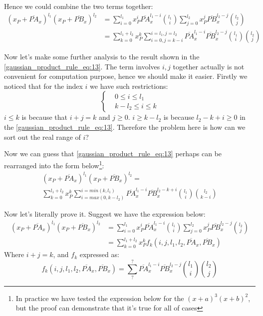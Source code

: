 Hence we could combine the two terms together:
\begin{equation}
\label{gaussian_product_rule_eq:13}
\begin{split}
(x_{P} +\overline{PA}_{x})^{l_{1}}(x_{P} + \overline{PB}_{x})^{l_{2}}
&=  \sum_{i=0}^{l_{1}} x_{P}^{i}\overline{PA}_{x}^{l_{1}-i}
\binom{l_{1}}{i}
    \sum_{j=0}^{l_{2}} x_{P}^{j}\overline{PB}_{x}^{l_{2}-j}
\binom{l_{2}}{j} \\
&= \sum_{k=0}^{l_{1}+l_{2}}x_{P}^{k}
\sum_{i=0,j=k-i}^{i=l_{1},j=l_{2}}\overline{PA}_{x}^{l_{1}-i}
\overline{PB}_{x}^{l_{2}-j}\binom{l_{1}}{i}\binom{l_{2}}{j}
\end{split}
\end{equation}

Now let's make some further analysis to the result shown in the \ref{gaussian_product_rule_eq:13}.
The term involves $i,j$ together actually is not convenient for computation purpose, hence we should
make it easier. Firstly we noticed that for the index $i$ we have such restrictions:
\begin{equation}
 \begin{cases}
  &0 \leq i \leq l_{1} \\
  &k-l_{2} \leq i \leq k
 \end{cases}
\end{equation}
$i\leq k$ is because that $i+j=k$ and $j\geq 0$. $i\geq k-l_{2}$ is because $l_{2} - k+i \geq 0$ in 
the \ref{gaussian_product_rule_eq:13}. Therefore the problem here is how can we sort out the 
real range of $i$?

Now we can guess that \ref{gaussian_product_rule_eq:13} perhaps can be rearranged into the form 
below\footnote{In practice we have tested the expression below for the $(x+a)^{3}(x+b)^{2}$, but
the proof can demonstrate that it's true for all of cases}:
\begin{multline}
\label{gaussian_product_rule_eq:14}
 (x_{P} +\overline{PA}_{x})^{l_{1}}(x_{P} + \overline{PB}_{x})^{l_{2}} = \\
\sum_{k=0}^{l_{1}+l_{2}}x_{P}^{k} 
\sum_{i=max(0,k-l_{2})}^{i=min(k,l_{1})}\overline{PA}_{x}^{l_{1}-i}
\overline{PB}_{x}^{l_{2}-k+i}\binom{l_{1}}{i}\binom{l_{2}}{k-i}
\end{multline}

Now let's literally prove it. Suggest we have the expression below:
\begin{align}
\label{gaussian_product_rule_eq:15}
 (x_{P} +\overline{PA}_{x})^{l_{1}}(x_{P} + \overline{PB}_{x})^{l_{2}} &= 
\sum_{i=0}^{l_{1}} x_{P}^{i}\overline{PA}_{x}^{l_{1}-i}
\binom{l_{1}}{i}
    \sum_{j=0}^{l_{2}} x_{P}^{j}\overline{PB}_{x}^{l_{2}-j}
\binom{l_{2}}{j} \nonumber \\
&=\sum_{k=0}^{l_{1}+l_{2}}x_{P}^{k} f_{k}(i,j,l_{1},l_{2},\overline{PA}_{x},\overline{PB}_{x})
\end{align} 
Where $i+j = k$, and $f_{k}$ expressed as:
\begin{equation}
\label{gaussian_product_rule_eq:16}
 f_{k}(i,j,l_{1},l_{2},\overline{PA}_{x},\overline{PB}_{x}) = 
\sum_{?}^{?}
\overline{PA}_{x}^{l_{1}-i}
\overline{PB}_{x}^{l_{2}-j}\binom{l_{1}}{i}\binom{l_{2}}{j}
\end{equation}

